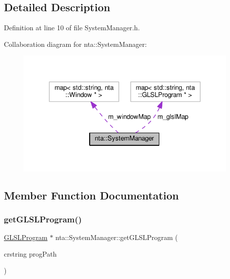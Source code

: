 \subsection{Detailed Description}


Definition at line 10 of file System\+Manager.\+h.



Collaboration diagram for nta\+:\+:System\+Manager\+:\nopagebreak
\begin{figure}[H]
\begin{center}
\leavevmode
\includegraphics[width=312pt]{d5/d24/classnta_1_1SystemManager__coll__graph}
\end{center}
\end{figure}


\subsection{Member Function Documentation}
\mbox{\label{classnta_1_1SystemManager_af37be3ff4538da0a95b5ca257187077c}} 
\subsubsection{\texorpdfstring{get\+G\+L\+S\+L\+Program()}{getGLSLProgram()}}
{\footnotesize\ttfamily \hyperlink{classnta_1_1GLSLProgram}{G\+L\+S\+L\+Program} $\ast$ nta\+::\+System\+Manager\+::get\+G\+L\+S\+L\+Program (\begin{DoxyParamCaption}\item[{crstring}]{prog\+Path }\end{DoxyParamCaption})\hspace{0.3cm}{\ttfamily [static]}}

